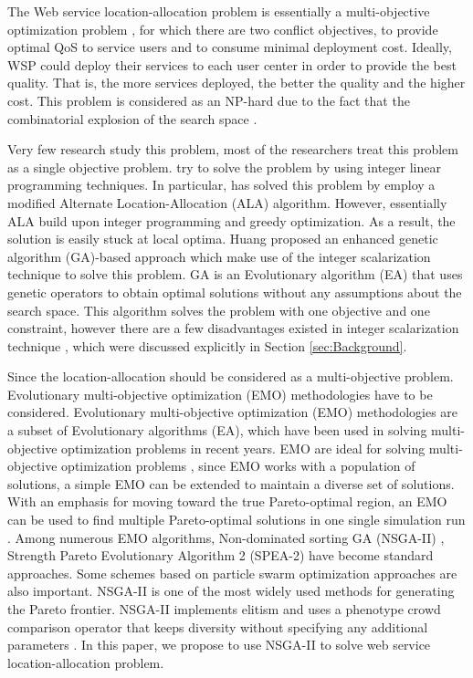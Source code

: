 \documentclass{llncs}
\begin{document}
The Web service location-allocation problem is essentially a multi-objective optimization problem \cite{Multiobjective}, for which there are two conflict objectives, to provide optimal 
QoS to service users and to consume minimal deployment cost.
Ideally, WSP could deploy their services to each user center in order to provide the best quality.
That is, the more services deployed, the better the quality and the higher cost. 
This problem is considered as an NP-hard due to the fact that the combinatorial explosion of the search space \cite{Vanrompay}. 


Very few research study this problem, most of the researchers treat this problem as a single objective problem.
\cite{Aboolian} \cite{Sun} try to solve the problem by using integer linear programming techniques.
In particular, \cite{Sun} has solved this problem by employ a modified Alternate Location-Allocation (ALA) algorithm. 
However, essentially ALA build upon integer programming and greedy optimization. 
As a result, the solution is easily stuck at local optima.
Huang \cite{EnhancedGenetic} proposed an enhanced genetic algorithm (GA)-based  \cite{man1996genetic} approach which make use of the integer scalarization technique to solve this problem.
GA is an Evolutionary algorithm (EA) that uses genetic operators to obtain optimal solutions without any assumptions about the search space.
This algorithm solves the problem with one objective and one constraint, however there are a few disadvantages existed in
integer scalarization technique \cite{Multiobjective}, which were discussed explicitly in Section \ref{sec:Background}.

Since the location-allocation should be considered as a multi-objective problem. Evolutionary multi-objective optimization (EMO) methodologies have to be considered.
Evolutionary multi-objective optimization (EMO) methodologies are a subset of Evolutionary algorithms (EA), which have been used in solving multi-objective optimization problems in recent years. 
EMO are ideal for solving multi-objective optimization problems \cite{key:article}, since EMO works with a population of solutions, 
a simple EMO can be extended to maintain a diverse set of solutions.
With an emphasis for moving toward the true Pareto-optimal region, an EMO can be used to find multiple Pareto-optimal solutions in 
one single simulation run \cite{OptimizationElectrical}. Among numerous EMO algorithms,
Non-dominated sorting GA (NSGA-II) \cite{996017}, Strength Pareto Evolutionary Algorithm 2 (SPEA-2) \cite{Deb} have become standard approaches. 
Some schemes based on particle swarm optimization approaches \cite{Elhossini} \cite{Huang} are also important. 
NSGA-II is one of the most widely used methods for generating the Pareto frontier. 
NSGA-II implements elitism and uses a phenotype crowd comparison operator that keeps diversity without specifying any additional parameters \cite{Deb06referencepoint}.
In this paper, we propose to use NSGA-II to solve web service location-allocation problem.
\end{document}
